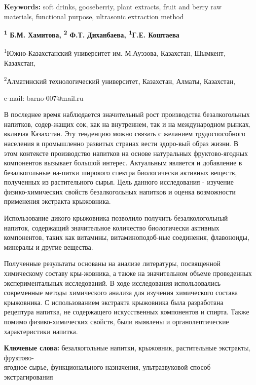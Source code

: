 {\bfseries Keywords:} soft drinks, gooseberriy, plant extracts, fruit and
berry raw materials, functional purpose, ultrasonic extraction method

\begin{center}

{\bfseries \textsuperscript{1} Б.М. Хамитова\envelope, \textsuperscript{2} Ф.Т. Диханбаева, \textsuperscript{1}Г.Е. Коштаева}

\textsuperscript{1}Южно-Казахстанский университет им. М.Ауэзова,
Казахстан, Шымкент, Казахстан,

\textsuperscript{2}Алматинский технологический университет, Казахстан,
Алматы, Казахстан,

e-mail: barno-007@mail.ru
\end{center}

В последнее время наблюдается значительный рост производства
безалкогольных напитков, содер-жащих сок, как на внутреннем, так и на
международном рынках, включая Казахстан. Эту тенденцию можно связать с
желанием трудоспособного населения в промышленно развитых странах вести
здоро-вый образ жизни. В этом контексте производство напитков на основе
натуральных фруктово-ягодных компонентов вызывает большой интерес.
Актуальным является и добавление в безалкогольные на-питки широкого
спектра биологически активных веществ, полученных из растительного
сырья. Цель данного исследования - изучение физико-химических свойств
безалкогольных напитков и оценка возможности применения экстракта
крыжовника.

Использование дикого крыжовника позволило получить безалкологольный
напиток, содержащий значительное количество биологически активных
компонентов, таких как витамины, витаминоподоб-ные соединения,
флавоноиды, минералы и другие вещества.

Полученные результаты основаны на анализе литературы, посвященной
химическому составу кры-жовника, а также на значительном объеме
проведенных экспериментальных исследований. В ходе исследования
использовались современные методы химического анализа для изучения
химического состава крыжовника. С использованием экстракта крыжовника
была разработана рецептура напитка, не содержащего искусственных
компонентов и спирта. Также помимо физико-химических свойств, были
выявлены и органолептические характеристики напитка.

{\bfseries Ключевые слова:} безалкогольные напитки, крыжовник, растительные
экстракты, фруктово-\\ягодное сырье, функционального назначения,
ультразвуковой способ экстрагирования

